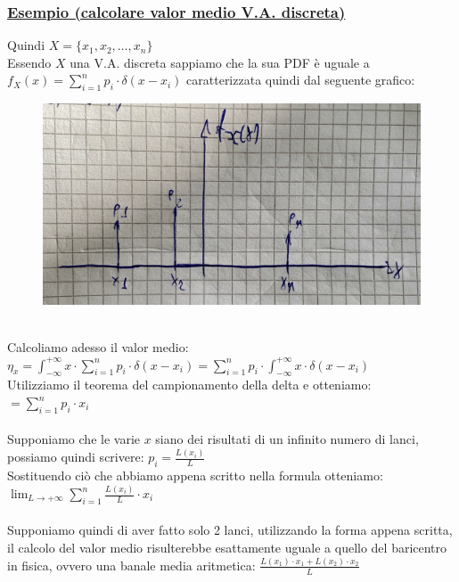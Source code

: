 \documentclass{article}
\begin{document}
\subsubsection{\underline{Esempio (calcolare valor medio V.A. discreta)}}
Quindi $X= \big\{ x_1,x_2, \dots, x_n\big\}$ \\
Essendo $X$ una V.A. discreta sappiamo che la sua PDF è uguale a $f_X(x) = \sum_{i=1}^{n} p_i \cdot \delta(x-x_i)$ caratterizzata quindi dal seguente grafico:
\begin{figure}[ht]
\centering
\includegraphics[scale=0.13]{images/46.PDF_Discreta.jpeg}
\end{figure} \\
Calcoliamo adesso il valor medio: \\
$\eta_x = \int_{- \infty}^{+ \infty} x \cdot \sum_{i=1}^{n} p_i \cdot \delta(x-x_i) = \sum_{i=1}^{n} p_i \cdot \int_{- \infty}^{+ \infty} x \cdot \delta(x-x_i)$ \\
Utilizziamo il teorema del campionamento della delta e otteniamo: \\
$= \sum_{i=1}^{n} p_i \cdot x_i$ \\ \\
Supponiamo che le varie $x$ siano dei risultati di un infinito numero di lanci, possiamo quindi scrivere: $p_i = \frac{L(x_i)}{L}$ \\
Sostituendo ciò che abbiamo appena scritto nella formula otteniamo: $\lim_{L \to +\infty} \sum_{i=1}^{n} \frac{L(x_i)}{L} \cdot x_i$ \\ \\
Supponiamo quindi di aver fatto solo 2 lanci, utilizzando la forma appena scritta, il calcolo del valor medio risulterebbe esattamente uguale a quello del baricentro in fisica, ovvero una banale media aritmetica: $\frac{L(x_1) \cdot x_1 + L(x_2) \cdot x_2}{L}$
\end{document}
